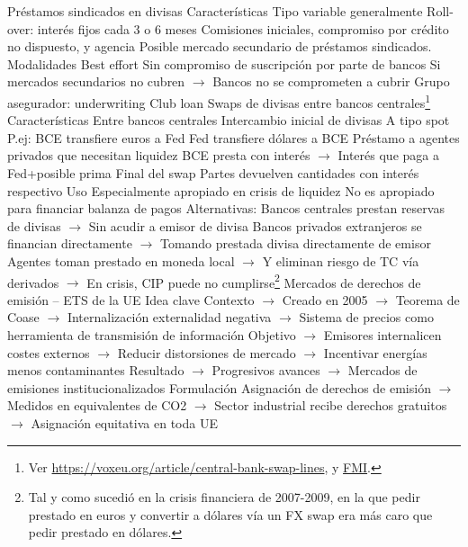 \documentclass{nuevotema}
\begin{document}
\begin{esquemal}
		\2 Préstamos sindicados en divisas
			\3 Características
				\4 Tipo variable generalmente
				\4 Roll-over: interés fijos cada 3 o 6 meses
				\4 Comisiones iniciales, compromiso por crédito no dispuesto, y agencia
				\4 Posible mercado secundario de préstamos sindicados.
			\3 Modalidades
				\4 Best effort
				\4[] Sin compromiso de suscripción por parte de bancos
				\4[] Si mercados secundarios no cubren
				\4[] $\to$ Bancos no se comprometen a cubrir
				\4 Grupo asegurador: underwriting
				\4 Club loan
		\2 Swaps de divisas entre bancos centrales\footnote{Ver \url{https://voxeu.org/article/central-bank-swap-lines}, y \href{https://www.imf.org/external/pubs/ft/bop/2018/pdf/Clarification0518.pdf}{FMI}.}
			\3 Características
				\4 Entre bancos centrales
				\4 Intercambio inicial de divisas
				\4[] A tipo spot
				\4[] P.ej:
				\4[] BCE transfiere euros a Fed
				\4[] Fed transfiere dólares a BCE
				\4 Préstamo a agentes privados que necesitan liquidez
				\4[] BCE presta con interés
				\4[] $\to$ Interés que paga a Fed+posible prima
				\4 Final del swap
				\4[] Partes devuelven cantidades con interés respectivo
			\3 Uso
				\4 Especialmente apropiado en crisis de liquidez
				\4 No es apropiado para financiar balanza de pagos
				\4 Alternativas:
				\4[] Bancos centrales prestan reservas de divisas
				\4[] $\to$ Sin acudir a emisor de divisa
				\4[] Bancos privados extranjeros se financian directamente
				\4[] $\to$ Tomando prestada divisa directamente de emisor
				\4[] Agentes toman prestado en moneda local
				\4[] $\to$ Y eliminan riesgo de TC vía derivados
				\4[] $\to$ En crisis, CIP puede no cumplirse\footnote{Tal y como sucedió en la crisis financiera de 2007-2009, en la que pedir prestado en euros y convertir a dólares vía un FX swap era más caro que pedir prestado en dólares.}
		\2 Mercados de derechos de emisión -- ETS de la UE
			\3 Idea clave
				\4 Contexto
				\4[] $\to$ Creado en 2005
				\4[] $\to$ Teorema de Coase
				\4[] $\to$ Internalización externalidad negativa
				\4[] $\to$ Sistema de precios como herramienta de transmisión de información
				\4 Objetivo
				\4[] $\to$ Emisores internalicen costes externos
				\4[] $\to$ Reducir distorsiones de mercado
				\4[] $\to$ Incentivar energías menos contaminantes
				\4 Resultado
				\4[] $\to$ Progresivos avances
				\4[] $\to$ Mercados de emisiones institucionalizados
			\3 Formulación
				\4 Asignación de derechos de emisión
				\4[] $\to$ Medidos en equivalentes de CO2
				\4[] $\to$ Sector industrial recibe derechos gratuitos
				\4[] $\to$ Asignación equitativa en toda UE

\end{esquemal}
\end{document}
